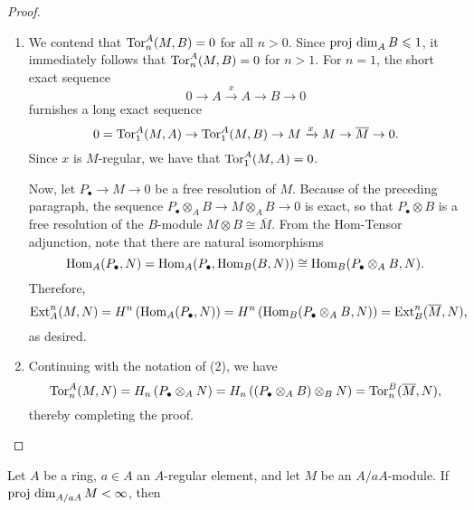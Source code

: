 \begin{proof}
\begin{enumerate}[label=(\arabic*)]
\item We contend that $\operatorname{Tor}^A_n(M, B) = 0$ for all $n > 0$. Since $\operatorname{proj~dim}_A B\leqslant 1$, it immediately follows that $\operatorname{Tor}^A_n(M, B) = 0$ for $n > 1$. For $n = 1$, the short exact sequence 
\begin{equation*}
    0\to A\xrightarrow x A\to B\to 0 
\end{equation*}
furnishes a long exact sequence 
\begin{equation*}
    0 = \operatorname{Tor}^A_1(M, A)\to\operatorname{Tor}^A_1(M, B)\to M\xrightarrow x M\to \overline M\to 0.
\end{equation*}
Since $x$ is $M$-regular, we have that $\operatorname{Tor}^A_1(M, A) = 0$.

Now, let $P_\bullet\to M\to 0$ be a free resolution of $M$. Because of the preceding paragraph, the sequence $P_\bullet\otimes_A B\to M\otimes_A B\to 0$ is exact, so that $P_\bullet\otimes B$ is a free resolution of the $B$-module $M\otimes B\cong\overline M$. From the Hom-Tensor adjunction, note that there are natural isomorphisms
\begin{equation*}
    \operatorname{Hom}_A(P_\bullet, N) = \operatorname{Hom}_A(P_\bullet, \operatorname{Hom}_B(B, N))\cong\operatorname{Hom}_B(P_\bullet\otimes_A B, N).
\end{equation*}
Therefore, 
\begin{equation*}
    \operatorname{Ext}^n_A(M, N) = H^n\left(\operatorname{Hom}_A(P_\bullet, N)\right) = H^n\left(\operatorname{Hom}_B(P_\bullet\otimes_A B, N)\right) = \operatorname{Ext}^n_B(\overline M, N),
\end{equation*}
as desired.

\item Continuing with the notation of (2), we have 
\begin{equation*}
    \operatorname{Tor}^A_n(M, N) = H_n\left(P_\bullet\otimes_A N\right) = H_n\left((P_\bullet\otimes_A B)\otimes_B N\right) = \operatorname{Tor}^B_n(\overline M, N),
\end{equation*}
thereby completing the proof. \qedhere
\end{enumerate}
\end{proof}

\begin{theorem}
    Let $A$ be a ring, $a\in A$ an $A$-regular element, and let $M$ be an $A/aA$-module. If $\operatorname{proj~dim}_{A/aA} M < \infty$, then 
\end{theorem}